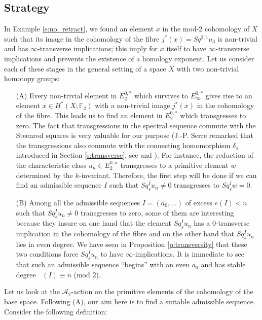 \documentclass{conm-p-l}
\theoremstyle{definition}
\DeclareMathOperator{\degst}{deg_{st}}
\newcommand{\F}{\mathbb{F}}
\newcommand{\A}{\mathcal{A}}
\begin{document}
\medskip
\subsection*{Strategy}
In Example \ref{e:no_retract}, we found an element $x$ in the mod-$2$ cohomology of $X$ such that its image in the cohomology of the fibre $j^*(x)=Sq^{2,1}u_3$ is non-trivial and has $\infty$-transverse implications; this imply for $x$ itself to have $\infty$-transverse implications and prevents the existence of a homology exponent. Let us consider each of these stages in the general setting of a space $X$ with two non-trivial homotopy groups:
\begin{itemize}
\item[(A)]{Every non-trivial element in $E_2^{0,*}$ which survives to $E_\infty^{0,*}$ gives rise to an element $x\in H^*(X;\F_2)$ with a non-trivial image $j^*(x)$ in the cohomology of the fibre. This leads us to find an element in $E_2^{0,*}$ which transgresses to zero. The fact that transgressions in the spectral sequence commute with the Steenrod squares is very valuable for our purpose (J.-P. Serre remarked that the transgressions also commute with the connecting homomorphism $\delta_s$ introduced in Section \ref{s:transverse}, see \cite[p. 206]{Se53} and \cite[p. 457]{Se51}). For instance, the reduction of the characteristic class $u_n\in E_2^{0,n}$ transgresses to a primitive element $w$ determined by the $k$-invariant. Therefore, the first step will be done if we can find an admissible sequence $I$ such that $Sq^I_s u_n\not=0$ transgresses to $Sq^I_s w=0$.}
\item[(B)]{Among all the admissible sequences $I=(a_0,\dots)$ of excess $e(I)<n$ such that $Sq^I_s u_n\not=0$ transgresses to zero, some of them are interesting because they insure on one hand that the element $Sq^I_s u_n$ has a $0$-transverse implication in the cohomology of the fibre and on the other hand that $Sq^I_s u_n$ lies in even degree. We have seen in Proposition \ref{p:transversity} that these two conditions force $Sq^I_s u_n$ to have $\infty$-implications. It is immediate to see that such an admissible sequence ``begins'' with an even $a_0$ and has stable degree $\degst(I)\equiv n$ (mod $2$).}
\end{itemize}

Let us look at the $\A_2$-action on the primitive elements of the cohomology of the base space. Following (A), our aim here is to find a suitable admissible sequence. Consider the following definition:
\end{document}
